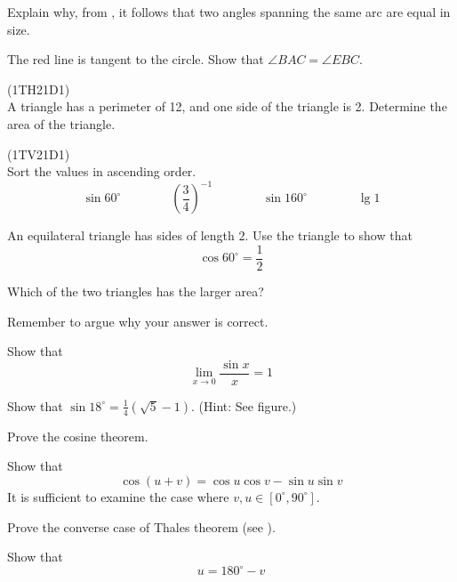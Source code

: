 Explain why, from , it follows that two angles spanning the same arc are equal in size.

 \vs
{}

\newpage
{}
The red line is tangent to the circle. Show that $ \angle BAC=\angle EBC $.

\newpage
{} 
(1TH21D1) \\
A triangle has a perimeter of 12, and one side of the triangle is 2. Determine the area of the triangle.


(1TV21D1)\\
Sort the values in ascending order.
\[ \sin 60^\circ\qquad\qquad \left(\frac{3}{4}\right)^{-1}\qquad\qquad\sin 160^\circ\qquad\qquad \lg 1\]

An equilateral triangle has sides of length 2.
Use the triangle to show that
\[ \cos 60^\circ = \frac{1}{2} \]

Which of the two triangles has the larger area? \os

Remember to argue why your answer is correct.

Show that 
\[\lim\limits_{x\to0} \frac{\sin x}{x}=1 \]


Show that $ \sin 18^\circ=\frac{1}{4}(\sqrt{5}-1) $. (Hint: See figure.)


Prove the cosine theorem.


\newpage
{}
Show that
\[ \cos(u+v)= \cos u\cos v-\sin u \sin v \]
It is sufficient to examine the case where $ v,u \in [0^\circ, 90^\circ] $.

Prove the converse case of Thales theorem (see  ).


Show that
\[ u=180^\circ-v \]

